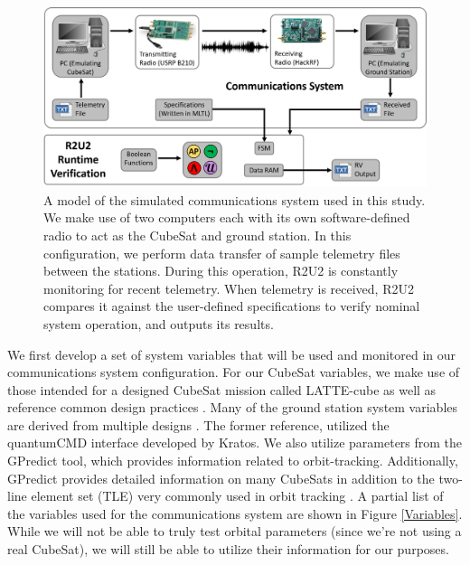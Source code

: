 \documentclass[conf]{new-aiaa}
\begin{document}
\begin{figure}[!ht]
\includegraphics[width=1.0\textwidth]{Fig/Setup.png}
\caption{A model of the simulated communications system used in this study. We make use of two computers each with its own software-defined radio to act as the CubeSat and ground station. In this configuration, we perform data transfer of sample telemetry files between the stations. During this operation, R2U2 is constantly monitoring for recent telemetry. When telemetry is received, R2U2 compares it against the user-defined specifications to verify nominal system operation, and outputs its results.}
\label{Overview}
\end{figure}

We first develop a set of system variables that will be used and monitored in our communications system configuration. For our CubeSat variables, we make use of those intended for a designed CubeSat mission called LATTE-cube as well as reference common design practices \cite{SMAD}. Many of the ground station system variables are derived from multiple designs \cite{choi2017, Asundi2013}. The former reference, \citep{choi2017} utilized the quantumCMD interface developed by Kratos. We also utilize parameters from the GPredict tool, which provides information related to orbit-tracking. Additionally, GPredict provides detailed information on many CubeSats in addition to the two-line element set (TLE) very commonly used in orbit tracking \cite{gpredict}. A partial list of the variables used for the communications system are shown in Figure \ref{Variables}. While we will not be able to truly test orbital parameters (since we're not using a real CubeSat), we will still be able to utilize their information for our purposes.
\end{document}
